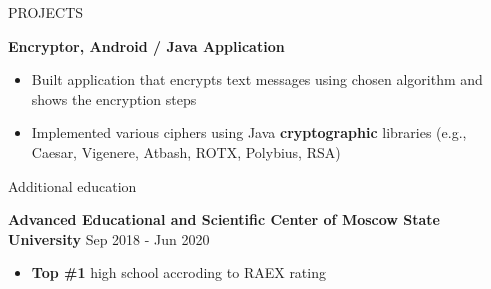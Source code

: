\documentclass{resume} %
\begin{document}
\begin{rSection}{PROJECTS}
\item \textbf{Encryptor, Android / Java Application}   %
\begin{itemize}
    \item Built application that encrypts text messages using chosen algorithm and shows the encryption steps
    \item Implemented various ciphers using Java \textbf{cryptographic} libraries (e.g., Caesar, Vigenere, Atbash, ROTX, Polybius, RSA)
\end{itemize}
\end{rSection} 




\begin{rSection}{Additional education}

{\bf Advanced Educational and Scientific Center of Moscow State University} \hfill {Sep 2018 - Jun 2020}
\begin{itemize}
    \item \textbf{Top \#1} high school accroding to RAEX rating
\end{itemize}


\end{rSection}
\end{document}
